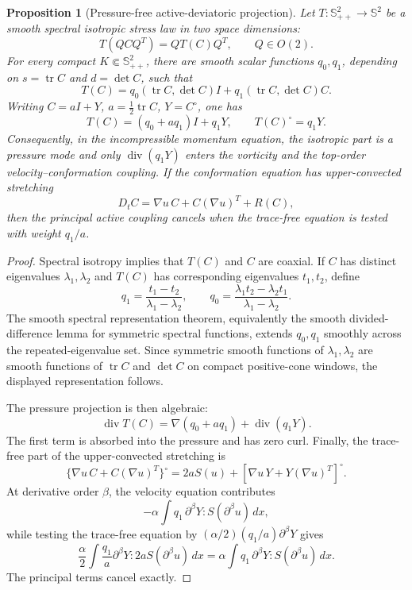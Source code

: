 \documentclass[11pt]{article}
\newtheorem{proposition}{Proposition}[section]
\newcommand{\Spp}{\mathbb S_{++}}
\newcommand{\Sym}{\mathbb S}
\newcommand{\tr}{\operatorname{tr}}
\newcommand{\divv}{\operatorname{div}}
\begin{document}
\begin{proposition}[Pressure-free active-deviatoric projection]
\label{prop:active-deviatoric-projection}
Let \(T:\Spp^2\to\Sym^2\) be a smooth spectral isotropic stress law in two
space dimensions:
\[
  T(QCQ^T)=QT(C)Q^T,\qquad Q\in O(2).
\]
For every compact \(K\Subset\Spp^2\), there are smooth scalar functions
\(q_0,q_1\), depending on \(s=\tr C\) and \(d=\det C\), such that
\[
  T(C)=q_0(\tr C,\det C)I+q_1(\tr C,\det C)C .
\]
Writing \(C=aI+Y\), \(a=\frac12\tr C\), \(Y=C^\circ\), one has
\[
  T(C)=(q_0+aq_1)I+q_1Y,\qquad T(C)^\circ=q_1Y .
\]
Consequently, in the incompressible momentum equation, the isotropic part is a
pressure mode and only \(\divv(q_1Y)\) enters the vorticity and the top-order
velocity--conformation coupling.
If the conformation equation has upper-convected stretching
\[
  D_tC=\nabla u\,C+C(\nabla u)^T+R(C),
\]
then the principal active coupling cancels when the trace-free equation is
tested with weight \(q_1/a\).
\end{proposition}

\begin{proof}
Spectral isotropy implies that \(T(C)\) and \(C\) are coaxial.  If \(C\) has
distinct eigenvalues \(\lambda_1,\lambda_2\) and \(T(C)\) has corresponding
eigenvalues \(t_1,t_2\), define
\[
  q_1=\frac{t_1-t_2}{\lambda_1-\lambda_2},\qquad
  q_0=\frac{\lambda_1t_2-\lambda_2t_1}{\lambda_1-\lambda_2}.
\]
The smooth spectral representation theorem, equivalently the smooth
divided-difference lemma for symmetric spectral functions, extends \(q_0,q_1\)
smoothly across the repeated-eigenvalue set.  Since symmetric smooth functions
of \(\lambda_1,\lambda_2\) are smooth functions of \(\tr C\) and \(\det C\) on
compact positive-cone windows, the displayed representation follows.

The pressure projection is then algebraic:
\[
  \divv T(C)=\nabla(q_0+aq_1)+\divv(q_1Y).
\]
The first term is absorbed into the pressure and has zero curl.  Finally, the
trace-free part of the upper-convected stretching is
\[
  \{\nabla u\,C+C(\nabla u)^T\}^\circ
  =2aS(u)+[\nabla u\,Y+Y(\nabla u)^T]^\circ .
\]
At derivative order \(\beta\), the velocity equation contributes
\[
  -\alpha\int q_1\,\partial^\beta Y:S(\partial^\beta u)\,dx,
\]
while testing the trace-free equation by
\((\alpha/2)(q_1/a)\partial^\beta Y\) gives
\[
  \frac{\alpha}{2}\int \frac{q_1}{a}\partial^\beta Y:
  2aS(\partial^\beta u)\,dx
  =
  \alpha\int q_1\,\partial^\beta Y:S(\partial^\beta u)\,dx .
\]
The principal terms cancel exactly.
\end{proof}
\end{document}
